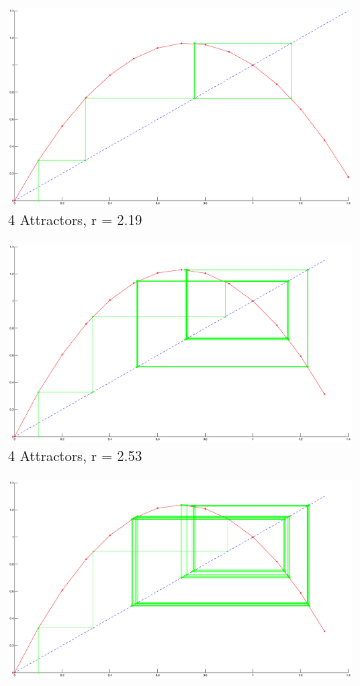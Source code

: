 \documentclass[a4wide, 10pt]{article}
\begin{document}
\begin{figure}[H]
        \centering
        \begin{subfigure}[b]{0.19\textwidth}
                \includegraphics[width=\textwidth]{EPSFiles/CobwebPD_2_VMap}
                \caption{4 Attractors, \newline \hspace{2cm} r = 2.19}
                \label{fig:Cobweb2}
        \end{subfigure}
        \begin{subfigure}[b]{0.19\textwidth}
                \includegraphics[width=\textwidth]{EPSFiles/CobwebPD_4_VMap}
                \caption{4 Attractors, \newline r = 2.53}
                \label{fig:Cobweb4}
        \end{subfigure}
        \begin{subfigure}[b]{0.19\textwidth}
                \includegraphics[width=\textwidth]{EPSFiles/CobwebPD_8_VMap}

\end{subfigure}
\end{figure}
\end{document}
